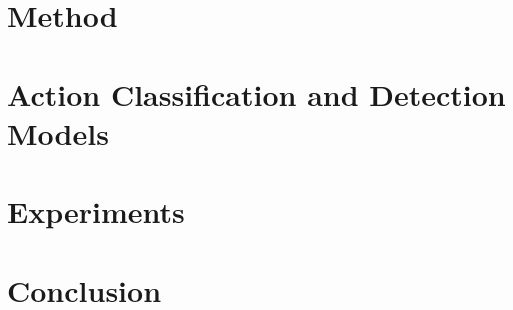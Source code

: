 \documentclass[runningheads]{llncs}
\begin{document}
\section{Method}


\section{Action Classification and Detection Models}
\label{sec:models}


\section{Experiments}


\section{Conclusion}


\clearpage



\end{document}
